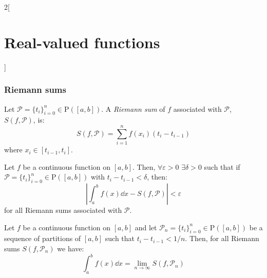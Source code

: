 \documentclass[../../../main_math.tex]{subfiles}
\begin{document}
\begin{multicols}{2}[\section{Real-valued functions}]
  \subsubsection{Riemann sums}
  \begin{definition}
    Let $\mathcal{P}=\{t_i\}_{i=0}^n\in\mathrm{P}([a,b])$. A \emph{Riemann sum} of $f$ associated with $\mathcal{P}$, $S(f,\mathcal{P})$, is: $$S(f,\mathcal{P})=\sum_{i=1}^nf(x_i)(t_i-t_{i-1})$$ where $x_i\in[t_{i-1},t_i]$.
  \end{definition}
  \begin{theorem}
    Let $f$ be a continuous function on $[a,b]$. Then, $\forall\varepsilon>0$ $\exists\delta>0$ such that if $\mathcal{P}=\{t_i\}_{i=0}^n\in\mathrm{P}([a,b])$ with $t_i-t_{i-1}<\delta$, then: $$\left|\int_a^bf(x)\dd{x}-S(f,\mathcal{P})\right|<\varepsilon$$ for all Riemann sums associated with $\mathcal{P}$.
  \end{theorem}
  \begin{corollary}
    Let $f$ be a continuous function on $[a,b]$ and let $\mathcal{P}_n=\{t_i\}_{i=0}^n\in\mathrm{P}([a,b])$ be a sequence of partitions of $[a,b]$ such that $t_i-t_{i-1}<1/n$. Then, for all Riemann sums $S(f,\mathcal{P}_n)$ we have: $$\int_a^bf(x)\dd{x}=\lim_{n\to\infty}S(f,\mathcal{P}_n)$$
  \end{corollary}

\end{multicols}
\end{document}

